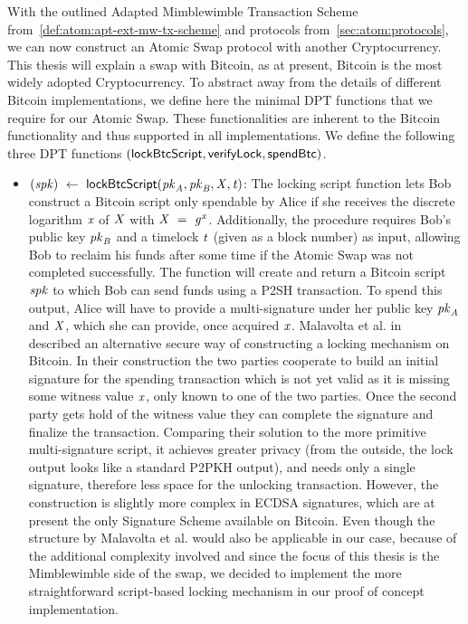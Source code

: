 With the outlined Adapted Mimblewimble Transaction Scheme from~\cref{def:atom:apt-ext-mw-tx-scheme} and protocols from~\cref{sec:atom:protocols}, we can now construct an Atomic Swap protocol with another Cryptocurrency.
This thesis will explain a swap with Bitcoin, as at present, Bitcoin is the most widely adopted Cryptocurrency.
To abstract away from the details of different Bitcoin implementations, we define here the minimal DPT functions that we require for our Atomic Swap.
These functionalities are inherent to the Bitcoin functionality and thus supported in all implementations.
We define the following three DPT functions $(\mathsf{lockBtcScript}, \mathsf{verifyLock}, \mathsf{spendBtc})$.
\begin{itemize}
    \item $(\mathit{spk}) ~\leftarrow~ \mathsf{lockBtcScript} (\mathit{pk}_{\mathit{A}},\mathit{pk}_{\mathit{B}},\mathit{X},\mathit{t})$:
    The locking script function lets Bob construct a Bitcoin script only spendable by Alice if she receives the discrete logarithm $\mathit{x}$ of $\mathit{X}$ with $\mathit{X} ~=~ \mathit{g}^{\mathit{x}}$.
    Additionally, the procedure requires Bob's public key $\mathit{pk}_{\mathit{B}}$ and a timelock $\mathit{t}$ (given as a block number) as input, allowing Bob to reclaim his funds after some time if the Atomic Swap was not completed successfully.
    The function will create and return a Bitcoin script $\mathit{spk}$ to which Bob can send funds using a P2SH transaction.
    To spend this output, Alice will have to provide a multi-signature under her public key $\mathit{pk}_{\mathit{A}}$ and $\mathit{X}$, which she can provide, once acquired $\mathit{x}$.
    Malavolta et al. in~\cite{malavolta2019anonymous} described an alternative secure way of constructing a locking mechanism on Bitcoin.
    In their construction the two parties cooperate to build an initial signature for the spending transaction which is not yet valid as it is missing some witness value $\mathit{x}$, only known to one of the two parties.
    Once the second party gets hold of the witness value they can complete the signature and finalize the transaction.
    Comparing their solution to the more primitive multi-signature script, it achieves greater privacy (from the outside, the lock output looks like a standard P2PKH output), and needs only a single signature, therefore less space for the unlocking transaction.
    However, the construction is slightly more complex in ECDSA signatures, which are at present the only Signature Scheme available on Bitcoin.
    Even though the structure by Malavolta et al. would also be applicable in our case, because of the additional complexity involved and since the focus of this thesis is the Mimblewimble side of the swap, we decided to implement the more straightforward script-based locking mechanism in our proof of concept implementation.

\end{itemize}
